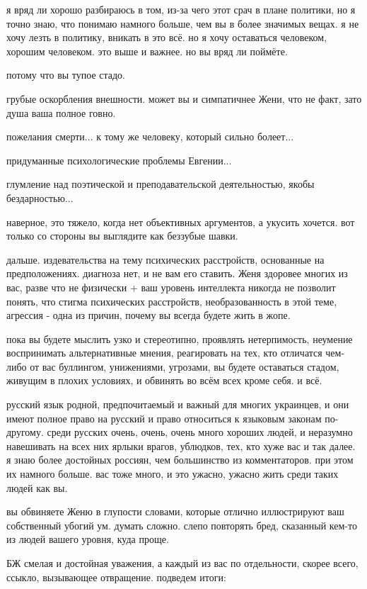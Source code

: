 \begin{itemize}
я вряд ли хорошо разбираюсь в том, из-за чего этот срач в плане политики, но я
точно знаю, что понимаю намного больше, чем вы в более значимых вещах. я не
хочу лезть в политику, вникать в это всё. но я хочу оставаться человеком,
хорошим человеком. это выше и важнее. но вы вряд ли поймёте.

потому что вы тупое стадо.

грубые оскорбления внешности. может вы и симпатичнее Жени, что не факт, зато душа ваша полное говно.

пожелания смерти... к тому же человеку, который сильно болеет...

придуманные психологические проблемы Евгении...

глумление над поэтической и преподавательской деятельностью, якобы бездарностью...

наверное, это тяжело, когда нет объективных аргументов, а укусить хочется. вот
только со стороны вы выглядите как беззубые шавки.

дальше. издевательства на тему психических расстройств, основанные на
предположениях. диагноза нет, и не вам его ставить. Женя здоровее многих из
вас, разве что не физически + ваш уровень интеллекта никогда не позволит
понять, что стигма психических расстройств, необразованность в этой теме,
агрессия - одна из причин, почему вы всегда будете жить в жопе.

пока вы будете мыслить узко и стереотипно, проявлять нетерпимость, неумение
воспринимать альтернативные мнения, реагировать на тех, кто отличатся чем-либо
от вас буллингом, унижениями, угрозами, вы будете оставаться стадом, живущим в
плохих условиях, и обвинять во всём всех кроме себя. и всё.

русский язык родной, предпочитаемый и важный для многих украинцев, и они имеют
полное право на русский и право относиться к языковым законам по-другому. среди
русских очень, очень, очень много хороших людей, и неразумно навешивать на всех
них ярлыки врагов, ублюдков, тех, кто хуже вас и так далее. я знаю более
достойных россиян, чем большинство из комментаторов. при этом их намного
больше. вас тоже много, и это ужасно, ужасно жить среди таких людей как вы.

вы обвиняете Женю в глупости словами, которые отлично иллюстрируют ваш
собственный убогий ум. думать сложно. слепо повторять бред, сказанный кем-то из
людей вашего уровня, куда проще.

БЖ смелая и достойная уважения, а каждый из вас по отдельности, скорее всего,
ссыкло, вызывающее отвращение.  подведем итоги:


\end{itemize}
